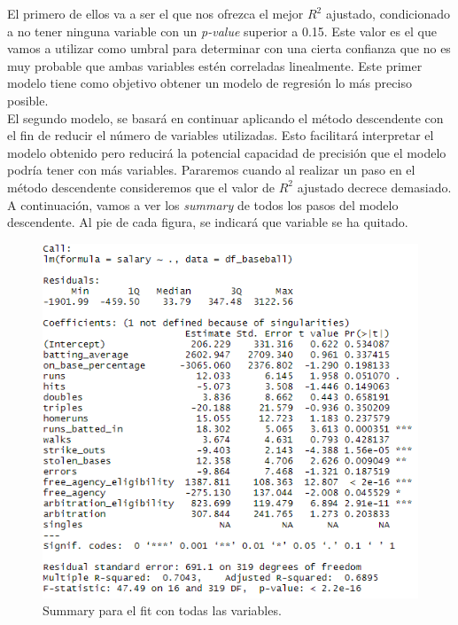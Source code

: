 \documentclass[a4paper,12pt, oneside]{book}
\begin{document}
El primero de ellos va a ser el que nos ofrezca el mejor $R^2$ ajustado, condicionado a no tener ninguna variable con un \textit{p-value} superior a 0.15. Este valor es el que vamos a utilizar como umbral para determinar con una cierta confianza que no es muy probable que ambas variables estén correladas linealmente. Este primer modelo tiene como objetivo obtener un modelo de regresión lo más preciso posible.\\

El segundo modelo, se basará en continuar aplicando el método descendente con el fin de reducir el número de variables utilizadas. Esto facilitará interpretar el modelo obtenido pero reducirá la potencial capacidad de precisión que el modelo podría tener con más variables. Pararemos cuando al realizar un paso en el método descendente consideremos que el valor de $R^2$ ajustado decrece demasiado.\\

A continuación, vamos a ver los \textit{summary} de todos los pasos del modelo descendente. Al pie de cada figura, se indicará que variable se ha quitado.\\

\begin{figure}[H]
\centering
\includegraphics[scale=0.7]{images/multifit1.PNG}
\caption{Summary para el fit con todas las variables.}
\end{figure}
\end{document}
